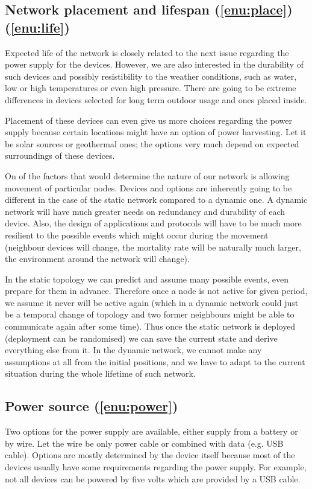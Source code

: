 \documentclass[
  print, %
  Table,   %
  nolof,     %
  nolot,     %
           oneside
]{fithesis3}
\begin{document}
  \subsection{Network placement and lifespan (\ref{enu:place}) (\ref{enu:life})}
  Expected life of the network is closely related to the next issue regarding the power supply for the devices. However, we are also interested in the durability of such devices and possibly resistibility to the weather conditions, such as water, low or high temperatures or even high pressure. There are going to be extreme differences in devices selected for long term outdoor usage and ones placed inside.

  Placement of these devices can even give us more choices regarding the power supply because certain locations might have an option of power harvesting. Let it be solar sources or geothermal ones; the options very much depend on expected surroundings of these devices.

  On of the factors that would determine the nature of our network is allowing movement of particular nodes. Devices and options are inherently going to be different in the case of the static network compared to a dynamic one. A dynamic network will have much greater needs on redundancy and durability of each device. Also, the design of applications and protocols will have to be much more resilient to the possible events which might occur during the movement (neighbour devices will change, the mortality rate will be naturally much larger, the environment around the network will change).

  In the static topology we can predict and assume many possible events, even prepare for them in advance. Therefore once a node is not active for given period, we assume it never will be active again (which in a dynamic network could just be a temporal change of topology and two former neighbours might be able to communicate again after some time). Thus once the static network is deployed (deployment can be randomised) we can save the current state and derive everything else from it. In the dynamic network, we cannot make any assumptions at all from the initial positions, and we have to adapt to the current situation during the whole lifetime of such network.

  \subsection{Power source (\ref{enu:power})}
  Two options for the power supply are available, either supply from a battery or by wire. Let the wire be only power cable or combined with data (e.g. USB cable). Options are mostly determined by the device itself because most of the devices usually have some requirements regarding the power supply. For example, not all devices can be powered by five volts which are provided by a USB cable.
\end{document}
